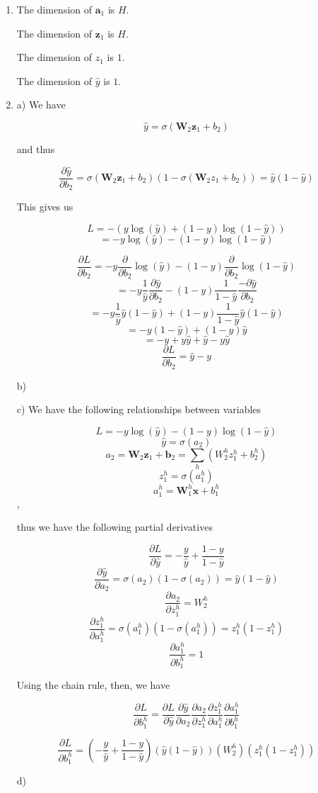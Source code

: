 \documentclass[submit]{harvardml}
\begin{document}
\begin{enumerate}

\item 
The dimension of $\mathbf{a}_1$ is $H$.

The dimension of $\mathbf{z}_1$ is $H$.

The dimension of $z_1$ is $1$.

The dimension of $\hat{y}$ is $1$.

\item

a)
We have 

$$\hat{y} = \sigma(\mathbf{W}_2 \mathbf{z}_1 + b_2)$$

and thus

$$ \frac{\partial\hat{y}}{\partial b_2} = \sigma(\mathbf{W}_2 \mathbf{z}_1 + b_2)(1-\sigma(\mathbf{W}_2 z_1 + b_2)) = \hat{y}(1 - \hat{y})$$

This gives us 

$$L = -(y \log (\hat{y}) + (1 - y) \log (1 - \hat{y}))$$
$$= -y \log (\hat{y}) - (1 - y) \log (1 - \hat{y})$$

$$\frac{\partial L}{\partial b_2} = -y \frac{\partial}{\partial b_2} \log (\hat{y}) - (1 - y) \frac{\partial}{\partial b_2}\log (1 - \hat{y})$$
$$ = -y \frac{1}{\hat{y}} \frac{\partial \hat{y}}{\partial b_2} - (1 - y) \frac{1}{1 - \hat{y}} \frac{-\partial \hat{y}}{\partial b_2}$$
$$ = -y \frac{1}{\hat{y}}  \hat{y}(1 - \hat{y}) + (1 - y) \frac{1}{1 - \hat{y}}  \hat{y}(1 - \hat{y})$$
$$ = -y (1 - \hat{y}) + (1 - y)   \hat{y}$$
$$ = -y + y\hat{y} + \hat{y} - y\hat{y}$$
$$ \boxed{\frac{\partial L}{\partial b_2} = \hat{y}-y} $$

b)




c) We have the following relationships between variables

$$L = -y \log (\hat{y}) - (1 - y) \log (1 - \hat{y})$$
$$\hat{y}=\sigma(a_2)$$
$$a_2=\mathbf{W}_2\mathbf{z}_1+\mathbf{b}_2=\sum_h (W_2^h z_1^h + b_2^h)$$
$$z^h_1=\sigma(a^h_1)$$
 $$a^h_1=\mathbf{W}^h_1\mathbf{x}+b^h_1$$,
 
thus we have the following partial derivatives

$$\frac{\partial L}{\partial\hat{y}}= -\frac{y}{\hat{y}} + \frac{1-y}{1-\hat{y}}$$
$$\frac{\partial\hat{y}}{\partial a_2}=\sigma(a_2)(1-\sigma(a_2))=\hat{y}(1-\hat{y})$$
$$\frac{\partial a_2}{\partial z_1^h} = W_2^h$$
$$\frac{\partial z^h_1}{\partial a_1^h} = \sigma(a_1^h)(1-\sigma(a_1^h))=z_1^h(1-z_1^h)$$
$$\frac{\partial a_1^h}{\partial b_1^h} = 1$$

Using the chain rule, then, we have

$$\frac{\partial L}{\partial b_1^h}=\frac{\partial L}{\partial\hat{y}}\frac{\partial\hat{y}}{\partial a_2}\frac{\partial a_2}{\partial z_1^h}\frac{\partial z_1^h}{\partial a_1^h} \frac{\partial a_1^h}{\partial b_1^h}$$

$$\boxed{
    \frac{\partial L}{\partial b_1^h}
    = \left(-\frac{y}{\hat{y}} + \frac{1-y}{1-\hat{y}}\right) 
    (\hat{y}(1-\hat{y}))
    (W_2^h)
    (z_1^h(1-z_1^h)) 
}
$$

d)

\end{enumerate}
\end{document}
